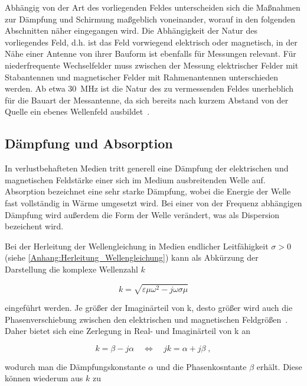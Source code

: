 Abhängig von der Art des vorliegenden Feldes unterscheiden sich die Maßnahmen zur Dämpfung und Schirmung maßgeblich voneinander, worauf in den folgenden Abschnitten näher eingegangen wird. Die Abhängigkeit der Natur des vorliegendes Feld, d.h. ist das Feld vorwiegend elektrisch oder magnetisch, in der Nähe einer Antenne von ihrer Bauform ist ebenfalls für Messungen relevant. Für niederfrequente Wechselfelder muss zwischen der Messung elektrischer Felder mit Stabantennen und magnetischer Felder mit Rahmenantennen unterschieden werden. Ab etwa \SI{30}{\mega\hertz} ist die Natur des zu vermessenden Feldes unerheblich für die Bauart der Messantenne, da sich bereits nach kurzem Abstand von der Quelle ein ebenes Wellenfeld ausbildet~\cite{Design_of_shielded_enclosures}.



\subsection{Dämpfung und Absorption}\label{cha:2_sub_Daempfung_und_Absorption}
In verlustbehafteten Medien tritt generell eine Dämpfung der elektrischen und magnetischen Feldstärke einer sich im Medium ausbreitenden Welle auf. Absorption bezeichnet eine sehr starke Dämpfung, wobei die Energie der Welle fast vollständig in Wärme umgesetzt wird. Bei einer von der Frequenz abhängigen Dämpfung wird außerdem die Form der Welle verändert, was als Dispersion bezeichent wird. 
\par
\vspace{\linespace}
Bei der Herleitung der Wellengleichung in Medien endlicher Leitfähigkeit $\sigma > 0$ (siehe \Anhang \ref{Anhang:Herleitung_Wellengleichung}) kann als Abkürzung der Darstellung die komplexe Wellenzahl $k$

\begin{equation}
    k = \sqrt{\varepsilon \mu \omega^2 - j \omega \sigma \mu}
\end{equation}

eingeführt werden. Je größer der Imaginärteil von k, desto größer wird auch die Phasenverschiebung zwischen den elektrischen und magnetischen Feldgrößen~\cite{EM_Schirmung}. Daher bietet sich eine Zerlegung in Real- und Imaginärteil von k an

\begin{equation}
    k = \beta - j \alpha \quad \Leftrightarrow \quad jk = \alpha + j\beta \; ,
\end{equation}

wodurch man die Dämpfungskonstante $\alpha$ und die Phasenkosntante $\beta$ erhält. Diese können wiederum aus $k$ zu

